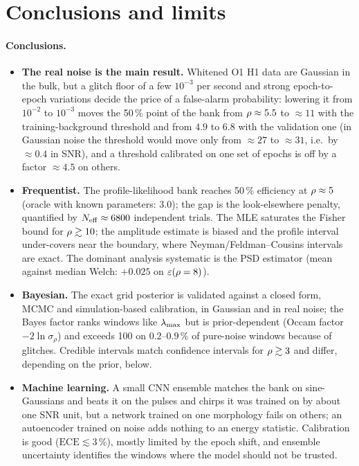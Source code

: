 \section{Conclusions and limits}\label{sec:conclusions}

\paragraph{Conclusions.}
\begin{itemize}[nosep]
\item \textbf{The real noise is the main result.} Whitened O1 H1 data are Gaussian in the bulk, but a glitch floor of a few $10^{-3}$ per second and strong epoch-to-epoch variations decide the price of a false-alarm probability: lowering it from $10^{-2}$ to $10^{-3}$ moves the 50\,\% point of the bank from $\rho\approx5.5$ to $\approx11$ with the training-background threshold and from $4.9$ to $6.8$ with the validation one (in Gaussian noise the threshold would move only from $\approx27$ to $\approx31$, i.e.\ by $\approx0.4$ in SNR), and a threshold calibrated on one set of epochs is off by a factor $\approx4.5$ on others.
\item \textbf{Frequentist.} The profile-likelihood bank reaches 50\,\% efficiency at $\rho\approx5$ (oracle with known parameters: $3.0$); the gap is the look-elsewhere penalty, quantified by $N_{\rm eff}\approx6800$ independent trials. The MLE saturates the Fisher bound for $\rho\gtrsim10$; the amplitude estimate is biased and the profile interval under-covers near the boundary, where Neyman/Feldman--Cousins intervals are exact. The dominant analysis systematic is the PSD estimator (mean against median Welch: $+0.025$ on $\varepsilon(\rho=8)$).
\item \textbf{Bayesian.} The exact grid posterior is validated against a closed form, MCMC and simulation-based calibration, in Gaussian and in real noise; the Bayes factor ranks windows like $\lambda_{\max}$ but is prior-dependent (Occam factor $-2\ln\sigma_\rho$) and exceeds 100 on $0.2$--$0.9\,\%$ of pure-noise windows because of glitches. Credible intervals match confidence intervals for $\rho\gtrsim3$ and differ, depending on the prior, below.
\item \textbf{Machine learning.} A small CNN ensemble matches the bank on sine-Gaussians and beats it on the pulses and chirps it was trained on by about one SNR unit, but a network trained on one morphology fails on others; an autoencoder trained on noise adds nothing to an energy statistic. Calibration is good ($\mathrm{ECE}\lesssim3\,\%$), mostly limited by the epoch shift, and ensemble uncertainty identifies the windows where the model should not be trusted.

\end{itemize}
